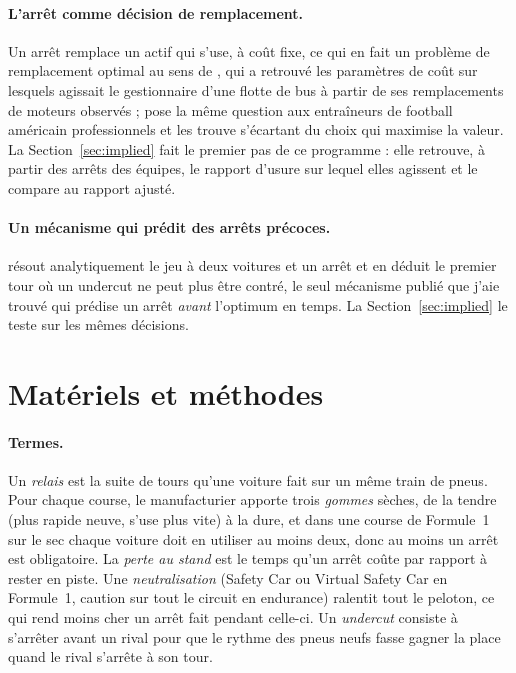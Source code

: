 \documentclass[11pt,a4paper]{article}
\begin{document}
\paragraph{L'arrêt comme décision de remplacement.} Un arrêt remplace un actif
qui s'use, à coût fixe, ce qui en fait un problème de remplacement optimal au
sens de \citet{rust1987}, qui a retrouvé les paramètres de coût sur lesquels
agissait le gestionnaire d'une flotte de bus à partir de ses remplacements de
moteurs observés ; \citet{romer2006} pose la même question aux entraîneurs de
football américain professionnels et les trouve s'écartant du choix qui
maximise la valeur. La Section~\ref{sec:implied} fait le premier pas de ce
programme : elle retrouve, à partir des arrêts des équipes, le rapport d'usure
sur lequel elles agissent et le compare au rapport ajusté.

\paragraph{Un mécanisme qui prédit des arrêts précoces.} \citet{salminen2026}
résout analytiquement le jeu à deux voitures et un arrêt et en déduit le
premier tour où un undercut ne peut plus être contré, le seul mécanisme publié
que j'aie trouvé qui prédise un arrêt \emph{avant} l'optimum en temps. La
Section~\ref{sec:implied} le teste sur les mêmes décisions.

\section{Matériels et méthodes}

\paragraph{Termes.} Un \emph{relais} est la suite de tours qu'une voiture fait sur
un même train de pneus. Pour chaque course, le manufacturier apporte trois
\emph{gommes} sèches, de la tendre (plus rapide neuve, s'use plus vite) à la dure,
et dans une course de Formule~1 sur le sec chaque voiture doit en utiliser au
moins deux, donc au moins un arrêt est obligatoire. La \emph{perte au stand} est
le temps qu'un arrêt coûte par rapport à rester en piste. Une
\emph{neutralisation} (Safety Car ou Virtual Safety Car en Formule~1, caution
sur tout le circuit en endurance) ralentit tout le peloton, ce qui rend moins
cher un arrêt fait pendant celle-ci. Un \emph{undercut} consiste à s'arrêter
avant un rival pour que le rythme des pneus neufs fasse gagner la place quand le
rival s'arrête à son tour.
\end{document}
